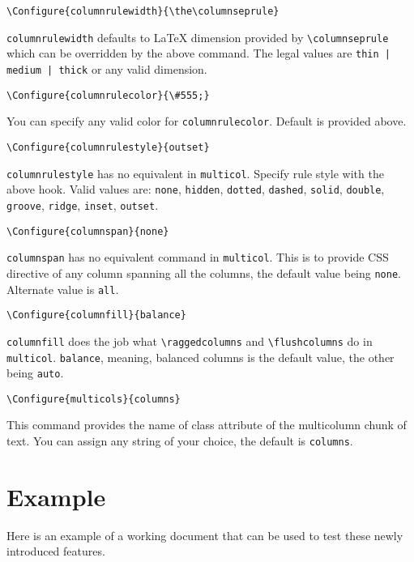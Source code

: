 \documentclass{article}
\begin{document}
\begin{verbatim}
\Configure{columnrulewidth}{\the\columnseprule}
\end{verbatim}
\texttt{columnrulewidth} defaults to \LaTeX{} dimension provided by
\texttt{\textbackslash{}columnseprule} which can be overridden by the
above command. The legal values are \texttt{thin | medium | thick} or
any valid dimension.

\begin{verbatim}
\Configure{columnrulecolor}{\#555;}
\end{verbatim}
You can specify any valid color for \texttt{columnrulecolor}. Default
is provided above.

\begin{verbatim}
\Configure{columnrulestyle}{outset}
\end{verbatim}
\texttt{columnrulestyle} has no equivalent in \texttt{multicol}. Specify
rule style with the above hook. Valid values are:
 \texttt{none}, \texttt{hidden}, \texttt{dotted}, \texttt{dashed},
 \texttt{solid}, \texttt{double},  \texttt{groove},
 \texttt{ridge}, \texttt{inset},  \texttt{outset}.

\begin{verbatim}
\Configure{columnspan}{none}
\end{verbatim}
     \texttt{columnspan} has no equivalent command in
     \texttt{multicol}. This is to provide CSS directive of any column
     spanning all the columns, the default value being
     \texttt{none}. Alternate value is \texttt{all}.

\begin{verbatim}
\Configure{columnfill}{balance}
\end{verbatim}
     \texttt{columnfill} does the job what
     \texttt{\textbackslash{}raggedcolumns} and
     \texttt{\textbackslash{}flushcolumns} do in
     \texttt{multicol}. \texttt{balance}, meaning, balanced columns is
     the default value, the other being \texttt{auto}.

\begin{verbatim}
\Configure{multicols}{columns}
\end{verbatim}
This command provides the name of class attribute of the multicolumn
chunk of text. You can assign any string of your choice, the default
is \texttt{columns}. 
\section*{Example}
\label{sec-4}
Here is an example of a working document that can be used to test
these newly introduced features.
\end{document}

